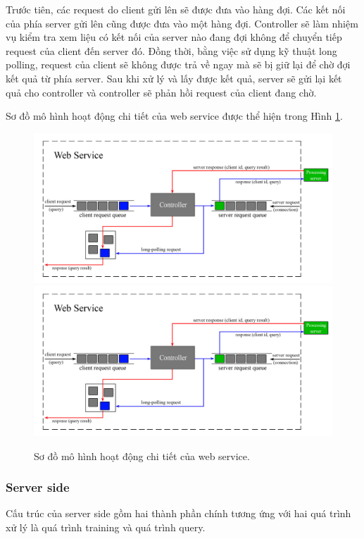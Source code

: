 Trước tiên, các request do client gửi lên sẽ được đưa vào hàng đợi. Các kết nối của phía server gửi lên cũng được đưa vào một hàng đợi. Controller sẽ làm nhiệm vụ kiểm tra xem liệu có kết nối của server nào đang đợi không để chuyển tiếp request của client đến server đó. Đồng thời, bằng việc sử dụng kỹ thuật long polling, request của client sẽ không được trả về ngay mà sẽ bị giữ lại để chờ đợi kết quả từ phía server. Sau khi xử lý và lấy được kết quả, server sẽ gửi lại kết quả cho controller và controller sẽ phản hồi request của client đang chờ.

Sơ đồ mô hình hoạt động chi tiết của web service được thể hiện trong Hình \ref{FigWS}.

\begin{figure}[!htbp]
  \begin{center}
    \leavevmode
    \ifpdf
      \includegraphics[scale=0.17]{ws_model}
    \else
      \includegraphics[scale=0.17]{ws_model}
    \fi
    \caption[Sơ đồ mô hình hoạt động chi tiết của web service]{Sơ đồ mô hình hoạt động chi tiết của web service.}
    \label{FigWS}
  \end{center}
\end{figure}


\subsubsection{Server side}
Cấu trúc của server side gồm hai thành phần chính tương ứng với hai quá trình xử lý là quá trình training và quá trình query.

